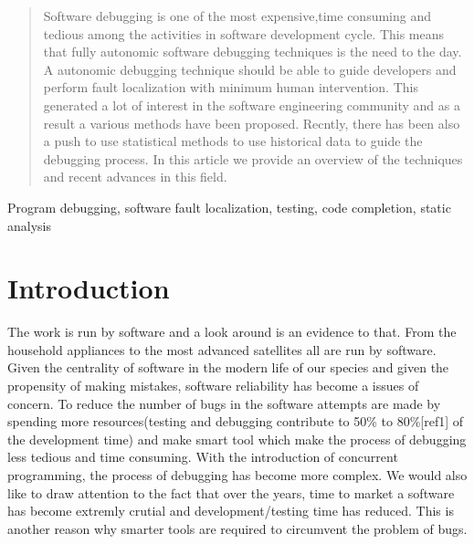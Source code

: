 \documentclass[10pt, conference, compsocconf]{IEEEtran}
\begin{document}
\begin{abstract}
Software debugging is one of the most expensive,time consuming and tedious among the activities in software development cycle. This means that fully autonomic software debugging techniques is the need to the day. A autonomic debugging technique should be able to guide developers and perform fault localization with minimum human intervention. This generated a lot of interest in the software engineering community and as a result a various methods have been proposed. Recntly, there has been also a push to use statistical methods to use historical data to guide the debugging process. In this article we provide an overview of the techniques and recent advances in this field. 

\end{abstract}

\begin{IEEEkeywords}
Program debugging, software fault localization, testing, code completion, static analysis

\end{IEEEkeywords}


%
\IEEEpeerreviewmaketitle



\section{Introduction}

The work is run by software and a look around is an evidence to that. From the household appliances to the most advanced satellites all are run by software. Given the centrality of software in the modern life of our species and given the propensity of making mistakes, software reliability has become a issues of concern. To reduce the number of bugs in the software attempts are made by spending more resources(testing and debugging contribute to 50\% to 80\%[ref1] of the development time) and make smart tool which make the process of debugging less tedious and time consuming. With the introduction of concurrent programming, the process of debugging has become more complex. We would also like to draw attention to the fact that over the years, time to market a software has become extremly crutial and development/testing time has reduced. This is another reason why smarter tools are required to circumvent the problem of bugs.
\end{document}
